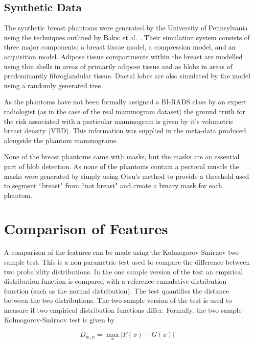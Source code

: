 \subsection{Synthetic Data}
The synthetic breast phantoms were generated by the University of Pennsylvania using the techniques outlined by Bakic et al. \cite{bakic2002mammogram1, bakic2002mammogram2, bakic2003mammogram3}. Their simulation system consists of three major components: a breast tissue model, a compression model, and an acquisition model. Adipose tissue compartments within the breast are modelled using thin shells in areas of primarily adipose tissue and as blobs in areas of predominantly fibroglandular tissue. Ductal lobes are also simulated by the model using a randomly generated tree. 

As the phantoms have not been formally assigned a BI-RADS class by an expert radiologist (as in the case of the real mammogram dataset) the ground truth for the risk associated with a particular mammogram is given by it's volumetric breast density (VBD). This information was supplied in the meta-data produced alongside the phantom mammograms.

None of the breast phantoms came with masks, but the masks are an essential part of blob detection. As none of the phantoms contain a pectoral muscle the masks were generated by simply using Otsu's method \cite{otsu1975threshold} to provide a threshold used to segment ``breast" from ``not breast" and create a binary mask for each phantom. 


\section{Comparison of Features}
\label{sec:comparison-of-features}
A comparison of the features can be made using the Kolmogorov-Smirnov two sample test. This is a non parametric test used to compare the difference between two probability distributions. In the one sample version of the test an empirical distribution function is compared with a reference cumulative distribution function (such as the normal distribution). The test quantifies the distance between the two distributions. The two sample version of the test is used to measure if two empirical distribution functions differ. Formally, the two sample Kolmogorov-Smirnov test is given by \cite{realStatsTwoSampleKStest}

\begin{equation}
	D_{m,n} = \max\limits_x | F(x) - G(x) |
\end{equation}

